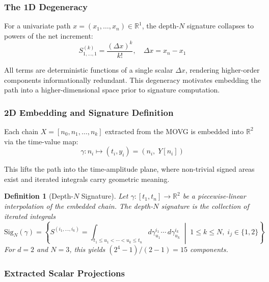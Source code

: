 \documentclass[a4paper,12pt]{article}
\newtheorem{definition}{Definition}
\begin{document}
\subsubsection{The 1D Degeneracy}

For a univariate path $x = (x_1, \ldots, x_n) \in \mathbb{R}^1$, the depth-$N$ signature collapses to powers of the net increment:
\begin{equation}
S^{(k)}_{1,\ldots,1} = \frac{(\Delta x)^k}{k!}, \quad \Delta x = x_n - x_1
\label{eq:1d-collapse}
\end{equation}

All terms are deterministic functions of a single scalar $\Delta x$, rendering higher-order components informationally redundant. This degeneracy motivates embedding the path into a higher-dimensional space prior to signature computation.

\subsubsection{2D Embedding and Signature Definition}

Each chain $X = [n_0, n_1, \ldots, n_k]$ extracted from the MOVG is embedded into $\mathbb{R}^2$ via the time-value map:
\begin{equation}
\gamma : n_i \mapsto (t_i, y_i) = (n_i,\; Y[n_i])
\label{eq:2d-embedding}
\end{equation}

This lifts the path into the time-amplitude plane, where non-trivial signed areas exist and iterated integrals carry geometric meaning.

\begin{definition}[Depth-$N$ Signature]
\label{def:signature}
Let $\gamma : [t_1, t_n] \to \mathbb{R}^2$ be a piecewise-linear interpolation of the embedded chain. The depth-$N$ signature is the collection of iterated integrals
\begin{equation}
\mathrm{Sig}_N(\gamma) = \left\{ S^{(i_1, \ldots, i_k)} = \int_{t_1 \leq u_1 < \cdots < u_k \leq t_n} d\gamma^{i_1}_{u_1} \cdots\, d\gamma^{i_k}_{u_k} \;\middle|\; 1 \leq k \leq N,\; i_j \in \{1, 2\} \right\}
\label{eq:signature-def}
\end{equation}
For $d{=}2$ and $N{=}3$, this yields $(2^4 - 1)/(2-1) = 15$ components.
\end{definition}

\subsubsection{Extracted Scalar Projections}
\end{document}
